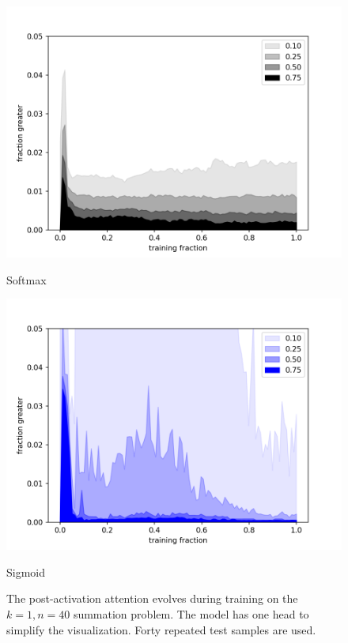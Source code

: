 \begin{figure}[h]
  \centering
  \begin{minipage}[b]{0.45\textwidth}
    \includegraphics[width=\textwidth]{figures/trans_softmax_attn_fraction.png}
    \captionsetup{labelformat=empty}
    \caption{Softmax}
    \addtocounter{figure}{-1}
  \end{minipage}
  \hfill
  \begin{minipage}[b]{0.45\textwidth}
    \includegraphics[width=\textwidth]{figures/trans_sigmoid,-4,False_attn_fraction.png}
    \captionsetup{labelformat=empty}
    \caption{Sigmoid}
    \addtocounter{figure}{-1}
  \end{minipage}
  \caption{The post-activation attention evolves during training on the $k=1, n=40$ summation problem.  The model has one head to simplify the visualization. Forty repeated test samples are used.}
  \label{fig:attn_evolve}
\end{figure}

